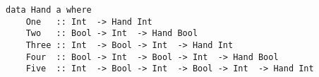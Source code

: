 \documentclass[12pt, a4paper, bibliography=totocnumbered]{scrreprt}
\newcommand{\inline}[1]{\lstinline[basicstyle=\ttfamily\footnotesize]{#1}}
\begin{document}
\begin{lstlisting}
data Hand a where
    One   :: Int  -> Hand Int
    Two   :: Bool -> Int  -> Hand Bool
    Three :: Int  -> Bool -> Int  -> Hand Int
    Four  :: Bool -> Int  -> Bool -> Int  -> Hand Bool
    Five  :: Int  -> Bool -> Int  -> Bool -> Int  -> Hand Int
\end{lstlisting}







\end{document}
